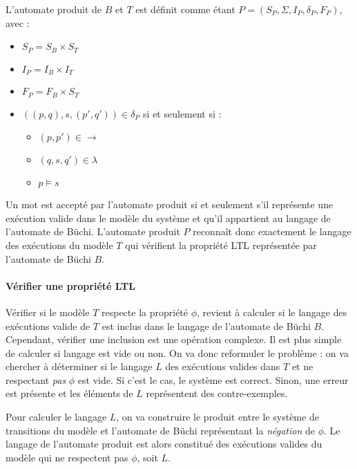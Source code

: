 L'automate produit de \(B\) et \(T\) est définit comme étant \(P = (S_P, \Sigma,
I_P, \delta_P, F_P)\), avec :

\begin{itemize}
\item
  \(S_P = S_B \times S_T\)
\item
  \(I_P = I_B \times I_T\)
\item
  \(F_P = F_B \times S_T\)
\item
  \(((p, q), s, (p', q')) \in \delta_P\) si et seulement si :

  \begin{itemize}
  \item
    \((p, p') \in \rightarrow\)
  \item
    \((q, s, q') \in \lambda\)
  \item
    \(p \models s\)
  \end{itemize}
\end{itemize}

Un mot est accepté par l'automate produit si et seulement s’il représente
une exécution valide dans le modèle du système et qu'il appartient au langage
de l'automate de Büchi.
L'automate produit \(P\) reconnaît donc exactement le langage des exécutions du
modèle \(T\) qui vérifient la propriété \ac{LTL} représentée par l'automate de
Büchi \(B\).

\paragraph{Vérifier une propriété LTL}

Vérifier si le modèle \(T\) respecte la propriété \(\phi\), revient à calculer
si le langage des exécutions valide de \(T\) est inclus dans le langage de
l'automate de Büchi \(B\). Cependant, vérifier une inclusion est une opération
complexe. Il est plus simple de calculer si langage est vide ou non. On va donc
reformuler le problème : on va chercher à déterminer si le langage \(L\) des
exécutions valides dans \(T\) et ne respectant \emph{pas} \(\phi\) est vide.
Si c'est le cas, le système est correct. Sinon, une erreur est présente et les
éléments de \(L\) représentent des contre-exemples.

Pour calculer le langage \(L\), on va construire le produit entre le système de
transitions du modèle et l'automate de Büchi représentant la \emph{négation} de
\(\phi\). Le langage de l'automate produit est alors constitué des exécutions valides du
modèle qui ne respectent pas \(\phi\), soit \(L\).

